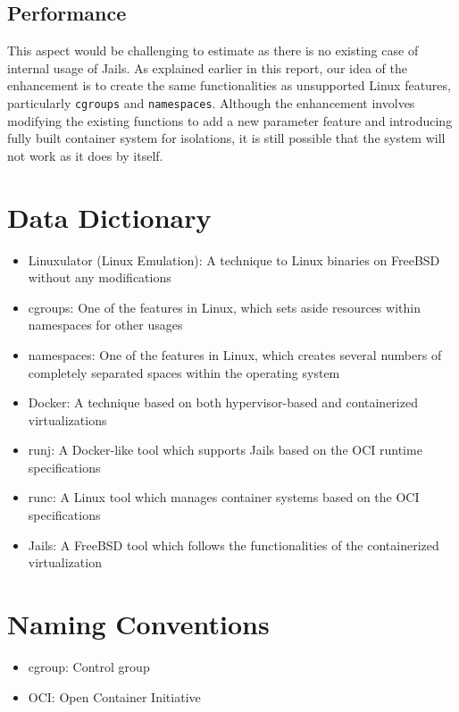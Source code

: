 \documentclass[12pt, dvipsnames, a4paper]{article}
\begin{document}
\subsection{Performance}
This aspect would be challenging to estimate as there is no existing case of internal usage of Jails. As explained earlier in this report, our idea of the enhancement is to create the same functionalities as unsupported Linux features, particularly \texttt{cgroups} and \texttt{namespaces}. Although the enhancement involves modifying the existing functions to add a new parameter feature and introducing fully built container system for isolations, it is still possible that the system will not work as it does by itself.

\section{Data Dictionary}
\begin{itemize}
	\item {Linuxulator (Linux Emulation): A technique to Linux binaries on FreeBSD without any modifications \cite{linuxulator}}
	\item {cgroups: One of the features in Linux, which sets aside resources within namespaces for other usages}
	\item {namespaces: One of the features in Linux, which creates several numbers of completely separated spaces within the operating system}
	\item {Docker: A technique based on both hypervisor-based and containerized virtualizations}
	\item {runj: A Docker-like tool which supports Jails based on the OCI runtime specifications}
	\item {runc: A Linux tool which manages container systems based on the OCI specifications}
	\item {Jails: A FreeBSD tool which follows the functionalities of the containerized virtualization}
\end{itemize}

\section{Naming Conventions}
\begin{itemize}
	\item {cgroup: Control group}
	\item {OCI: Open Container Initiative}
\end{itemize}
\end{document}
